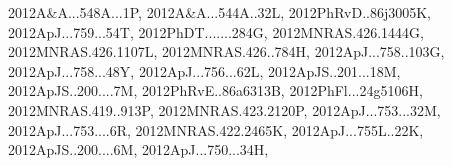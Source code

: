 \documentclass[12pt]{article}
\begin{document}
\begin{description}
{2012A&A...548A...1P,%
2012A&A...544A..32L,%
2012PhRvD..86j3005K,%
2012ApJ...759...54T,%
2012PhDT.......284G,%
2012MNRAS.426.1444G,%
2012MNRAS.426.1107L,%
2012MNRAS.426..784H,%
2012ApJ...758..103G,%
2012ApJ...758...48Y,%
2012ApJ...756...62L,%
2012ApJS..201...18M,%
2012ApJS..200....7M,%
2012PhRvE..86a6313B,%
2012PhFl...24g5106H,%
2012MNRAS.419..913P,%
2012MNRAS.423.2120P,%
2012ApJ...753...32M,%
2012ApJ...753....6R,%
2012MNRAS.422.2465K,%
2012ApJ...755L..22K,%
2012ApJS..200....6M,%
2012ApJ...750...34H,%
}
\end{description}
\end{document}
